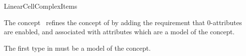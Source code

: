 \ccRefPageBegin

\begin{ccRefConcept}{LinearCellComplexItems}

\ccDefinition The concept \ccRefName\ refines the concept of
 by adding the requirement that
0-attributes are enabled, and associated with attributes which are a
model of the  concept.



\ccRefines
{}


The first type in  must be a model of the  
 concept.



\ccHasModels

\ccSeeAlso
{}\\
\\

\end{ccRefConcept}

\ccRefPageEnd


